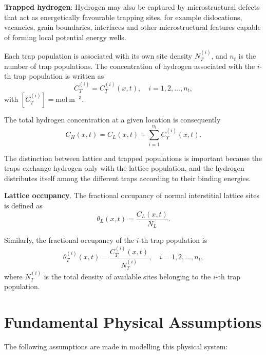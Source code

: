 \documentclass[a4paper,12pt,oneside]{report}
\begin{document}
\textbf{Trapped hydrogen}: Hydrogen may also be captured by microstructural defects that act as energetically favourable trapping sites, for example dislocations, vacancies, grain boundaries, interfaces and other microstructural features capable of forming local potential energy wells.

Each trap population is associated with its own site density $N_T^{(i)}$, and $n_t$ is the number of trap populations. The concentration of hydrogen associated with the $i$-th trap population is written as
\begin{equation}
C^{(i)}_T = C^{(i)}_T(x, t), \quad i = 1, 2, \dots , n_t,
\label{eq:ch3_CT}
\end{equation}
with $[C^{(i)}_T] = \mathrm{mol~m^{-3}}$.

The total hydrogen concentration at a given location is consequently
\begin{equation}
C_H(x, t) = C_L(x, t) + \sum_{i=1}^{n_t} C^{(i)}_T(x, t).
\label{eq:ch3_CH}
\end{equation}

The distinction between lattice and trapped populations is important because the traps exchange hydrogen only with the lattice population, and the hydrogen distributes itself among the different traps according to their binding energies.

\textbf{Lattice occupancy}. The fractional occupancy of normal interstitial lattice sites is defined as
\begin{equation}
\theta_L(x, t) = \frac{C_L(x, t)}{N_L}.
\label{eq:ch3_thetaL}
\end{equation}

Similarly, the fractional occupancy of the $i$-th trap population is
\begin{equation}
\theta^{(i)}_T(x, t) = \frac{C^{(i)}_T(x, t)}{N^{(i)}_T}, \quad i = 1, 2, \dots , n_t,
\label{eq:ch3_thetaT}
\end{equation}
where $N^{(i)}_T$ is the total density of available sites belonging to the $i$-th trap population.

\section{Fundamental Physical Assumptions}

The following assumptions are made in modelling this physical system:
\end{document}
